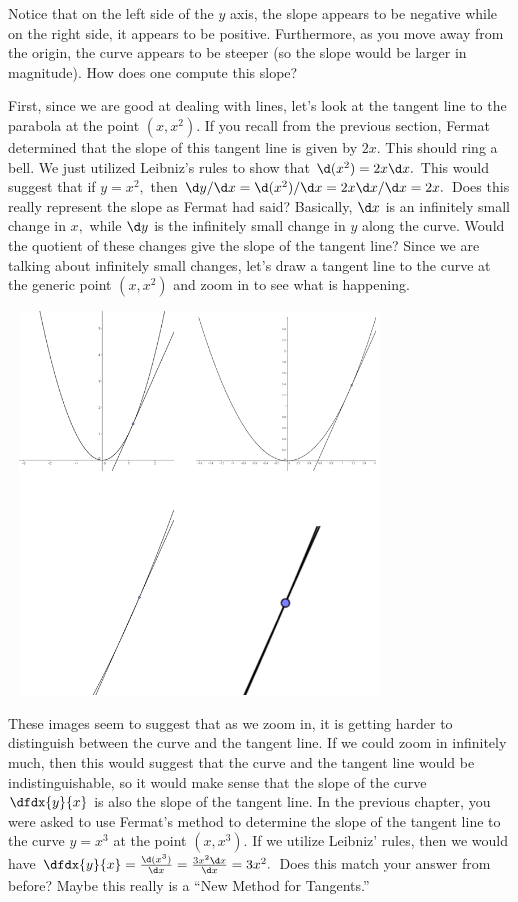 Notice that on the left side of the $y$ axis, the slope appears to be
negative while on the right side, it appears to be positive.
Furthermore, as you move away from the origin, the curve appears to be
steeper (so the slope would be larger in magnitude).  How does one
compute this slope? 

First, since we are good at dealing with lines, let's look at the
tangent line to the parabola at the point $(x,x^2).$  If you recall
from the previous section, Fermat determined that the slope of this
tangent line is given by $2x.$  This should ring a bell.  We just
utilized Leibniz's rules to show that $\d (x^2)=2x\d x.$  This would
suggest that if $y=x^2,$ then $\d y/\d x=\d (x^2)/\d x=2x\d x/\d x=2x.$  Does this
really represent the slope as Fermat had said?  Basically, $\d x$ is an
infinitely small change in $x,$ while $\d y$ is the infinitely small change
in $y$ along the curve.  Would the quotient of these changes give the
slope of the tangent line?  Since we are talking about infinitely
small changes, let's draw a tangent line to the curve at the generic
point $(x,x^2)$ and zoom in to see what is happening.

\centerline{\includegraphics*[height=4in,width=4in]{Figures/parabola-zoom}}

These images seem to suggest that as we zoom in, it is getting harder
to distinguish between the curve and the tangent line.  If we could
zoom in infinitely much, then this would suggest that the curve and
the tangent line would be indistinguishable, so it would make sense
that the slope of the curve $\dfdx{y}{x}$ is also the slope of the tangent
line.  In the previous chapter, you were asked to use Fermat's method
to determine the slope of the tangent line to the curve $y=x^3$ at the
point $(x,x^3).$  If we utilize Leibniz' rules, then we would have
$\dfdx{y}{x}=\frac{\d(x^3 )}{\d x}=\frac{3x^2 \d x}{\d x}=3x^2.$  Does this match your answer from
before?  Maybe this really is a ``New Method for Tangents.''

